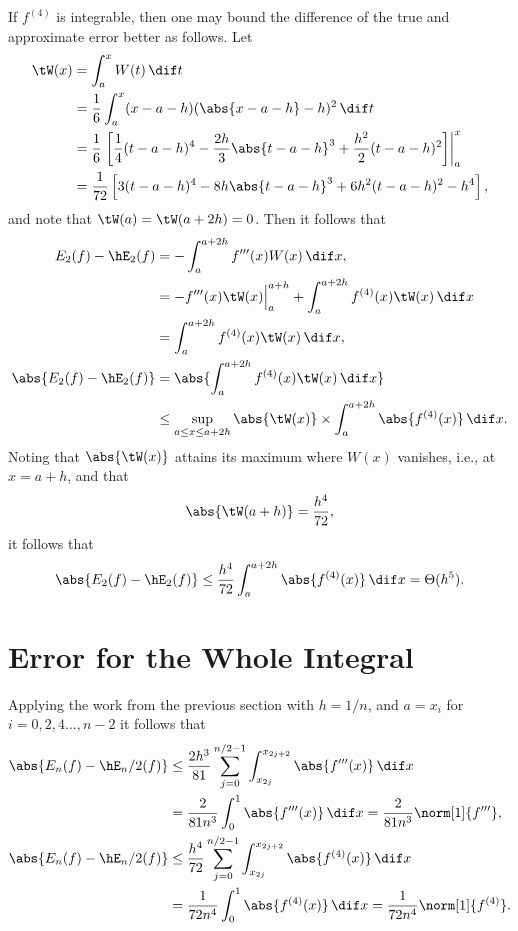\documentclass[]{elsarticle}
\theoremstyle{definition}
\theoremstyle{remark}
\begin{document}
If $f^{(4)}$ is integrable, then one may bound the difference of the true and approximate error better as follows.  Let 
\begin{align*}
\tW(x) &= \int_{a}^x W(t) \, \dif t \\
&=\frac{1}{6} \int_{a}^x  (x-a-h)(\abs{x-a-h} - h)^2 \, \dif t\\
&=\frac{1}{6} \left . \left[\frac{1}{4}(t-a-h)^4 - \frac{2h}3  \abs{t-a-h}^3 + \frac{h^2}2 (t-a-h)^2\right] \right \rvert_a^x \\
&=\frac{1}{72} \left[3(t-a-h)^4 - 8h\abs{t-a-h}^3 + 6h^2 (t-a-h)^2 - h^4\right],
\end{align*}
and note that $\tW(a)=\tW(a+2h)=0$.  Then it follows that
\begin{align*}
E_2(f) - \hE_2(f) &= - \int_a^{a+2h} f'''(x) W(x) \, \dif x, \\
&= -f'''(x) \tW(x) \Bigr \rvert_a^{a+h} + \int_a^{a+2h} f^{(4)}(x) \tW(x) \, \dif x \\
&= \int_a^{a+2h} f^{(4)}(x) \tW(x) \, \dif x, \\
\abs{E_2(f) - \hE_2(f)} &=\abs{\int_a^{a+2h} f^{(4)}(x) \tW(x) \, \dif x} \\
&\le \sup_{a \le x \le a+2h} \abs{\tW(x)} \times \int_a^{a+2h} \abs{f^{(4)}(x)} \, \dif x.
\end{align*}
Noting that $\abs{\tW(x)}$ attains its maximum where $W(x)$ vanishes, i.e., at $x=a+h$, and that
\[
\abs{\tW(a+h)}= \frac{h^4}{72},
\]
it follows that 
\begin{equation*}
\abs{E_2(f) - \hE_2(f)} \le \frac{h^4}{72} \int_a^{a+2h} \abs{f^{(4)}(x)} \, \dif x = \Theta(h^5).
\end{equation*}

\section{Error for the Whole Integral}
Applying the work from the previous section with $h=1/n$, and $a=x_i$ for $i=0, 2, 4 \ldots, n-2$ it follows that
\begin{align*}
\abs{E_n(f) - \hE_n/2(f)} & \le \frac{2h^3}{81} \sum_{j=0}^{n/2-1} \int_{x_{2j}}^{x_{2j+2}} \abs{f'''(x)} \, \dif x \\
& = \frac{2}{81n^3} \int_{0}^{1} \abs{f'''(x)} \, \dif x  = \frac{2}{81n^3} \norm[1]{f'''},  \\
\abs{E_n(f) - \hE_n/2(f)} & \le \frac{h^4}{72} \sum_{j=0}^{n/2-1} \int_{x_{2j}}^{x_{2j+2}} \abs{f^{(4)}(x)} \, \dif x\\
& = \frac{1}{72 n^4} \int_{0}^{1} \abs{f^{(4)}(x)} \, \dif x  = \frac{1}{72 n^4}\norm[1]{f^{(4)}}.
\end{align*}







\end{document}
